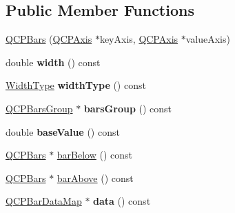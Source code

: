 \subsection*{\-Public \-Member \-Functions}
\begin{DoxyCompactItemize}
\item 
\hyperlink{classQCPBars_a64006999ad9dff308f40df41cef176ad}{\-Q\-C\-P\-Bars} (\hyperlink{classQCPAxis}{\-Q\-C\-P\-Axis} $\ast$key\-Axis, \hyperlink{classQCPAxis}{\-Q\-C\-P\-Axis} $\ast$value\-Axis)
\item 
\hypertarget{classQCPBars_a42798c38abd5f5db22bd45d77f429625}{double {\bfseries width} () const }\label{classQCPBars_a42798c38abd5f5db22bd45d77f429625}

\item 
\hypertarget{classQCPBars_a8606651ada5804075f6affd04c88dd05}{\hyperlink{classQCPBars_a65dbbf1ab41cbe993d71521096ed4649}{\-Width\-Type} {\bfseries width\-Type} () const }\label{classQCPBars_a8606651ada5804075f6affd04c88dd05}

\item 
\hypertarget{classQCPBars_a6d6b2b17619a0ba9c7a88bb2b90fc178}{\hyperlink{classQCPBarsGroup}{\-Q\-C\-P\-Bars\-Group} $\ast$ {\bfseries bars\-Group} () const }\label{classQCPBars_a6d6b2b17619a0ba9c7a88bb2b90fc178}

\item 
\hypertarget{classQCPBars_a3c8686a74396883fd1da87b2e325b043}{double {\bfseries base\-Value} () const }\label{classQCPBars_a3c8686a74396883fd1da87b2e325b043}

\item 
\hyperlink{classQCPBars}{\-Q\-C\-P\-Bars} $\ast$ \hyperlink{classQCPBars_a2c46a686cbad95f180ca3c2e88263961}{bar\-Below} () const 
\item 
\hyperlink{classQCPBars}{\-Q\-C\-P\-Bars} $\ast$ \hyperlink{classQCPBars_a9ca48a6577586825d85bdc1fbf410803}{bar\-Above} () const 
\item 
\hypertarget{classQCPBars_ac05c21de37f677545d06fd852ef8a743}{\hyperlink{qcustomplot_8h_aa846c77472cae93def9f1609d0c57191}{\-Q\-C\-P\-Bar\-Data\-Map} $\ast$ {\bfseries data} () const }\label{classQCPBars_ac05c21de37f677545d06fd852ef8a743}


\end{DoxyCompactItemize}
